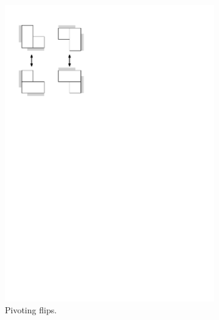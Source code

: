 \documentclass{amsart}
\theoremstyle{definition}
\begin{document}
\begin{figure}
\begin{center}
\begin{subfigure}{0.3\textwidth}
\begin{center}
    \includegraphics[page=1, scale=.5]{flipGraph.pdf}
    \caption{Pivoting flips.}
    \end{center}
  \end{subfigure}
    \begin{subfigure}{0.3\textwidth}
    \begin{center}

\end{center}
\end{subfigure}
\end{center}
\end{figure}
\end{document}
